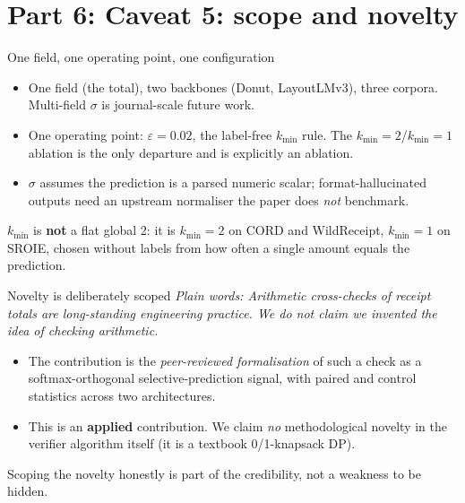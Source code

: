 \documentclass[aspectratio=169]{beamer}
\newcommand{\keybox}[1]{\begin{center}\colorbox{grey!15}{\parbox{0.92\linewidth}{\centering #1}}\end{center}}
\newcommand{\plain}[1]{\textit{\textcolor{sig}{Plain words:} #1}}
\begin{document}
\section{Part 6: Caveat 5: scope and novelty}
\begin{frame}{One field, one operating point, one configuration}
\begin{itemize}
\item One field (the total), two backbones (Donut, LayoutLMv3), three
corpora. Multi-field $\sigma$ is journal-scale future work.
\item One operating point: $\varepsilon{=}0.02$, the label-free
$k_{\min}$ rule. The $k_{\min}{=}2$/$k_{\min}{=}1$ ablation is the only
departure and is explicitly an ablation.
\item $\sigma$ assumes the prediction is a parsed numeric scalar;
format-hallucinated outputs need an upstream normaliser the paper does
\emph{not} benchmark.
\end{itemize}
\keybox{$k_{\min}$ is \textbf{not} a flat global 2: it is $k_{\min}{=}2$
on CORD and WildReceipt, $k_{\min}{=}1$ on SROIE, chosen without labels
from how often a single amount equals the prediction.}
\end{frame}

\begin{frame}{Novelty is deliberately scoped}
\plain{Arithmetic cross-checks of receipt totals are long-standing
engineering practice. We do not claim we invented the idea of checking
arithmetic.}
\begin{itemize}
\item The contribution is the \emph{peer-reviewed formalisation} of such
a check as a softmax-orthogonal selective-prediction signal, with paired
and control statistics across two architectures.
\item This is an \textbf{applied} contribution. We claim \emph{no}
methodological novelty in the verifier algorithm itself (it is a
textbook 0/1-knapsack DP).
\end{itemize}
\keybox{Scoping the novelty honestly is part of the credibility, not a
weakness to be hidden.}
\end{frame}

\end{document}
